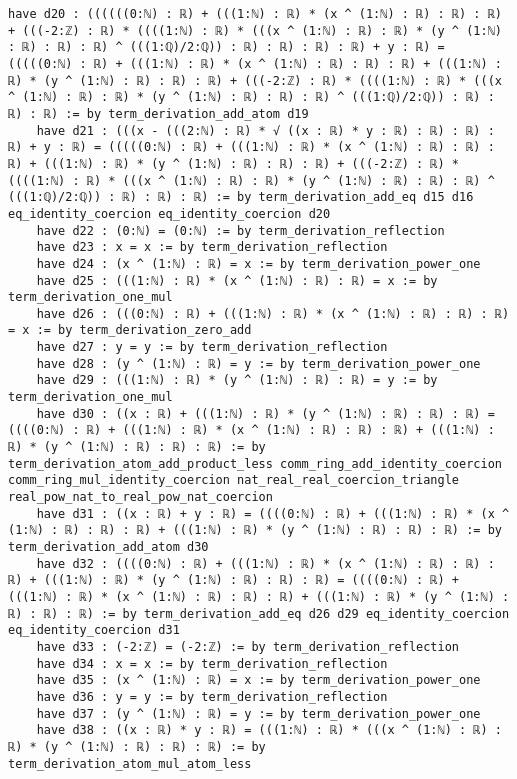 \documentclass{article}
\begin{document}
\begin{tcolorbox}[colback=white!10, width=\linewidth]
\begin{lstlisting}[language=Lean4]
    have d20 : ((((((0:ℕ) : ℝ) + (((1:ℕ) : ℝ) * (x ^ (1:ℕ) : ℝ) : ℝ) : ℝ) + (((-2:ℤ) : ℝ) * ((((1:ℕ) : ℝ) * (((x ^ (1:ℕ) : ℝ) : ℝ) * (y ^ (1:ℕ) : ℝ) : ℝ) : ℝ) ^ (((1:ℚ)/2:ℚ)) : ℝ) : ℝ) : ℝ) : ℝ) + y : ℝ) = (((((0:ℕ) : ℝ) + (((1:ℕ) : ℝ) * (x ^ (1:ℕ) : ℝ) : ℝ) : ℝ) + (((1:ℕ) : ℝ) * (y ^ (1:ℕ) : ℝ) : ℝ) : ℝ) + (((-2:ℤ) : ℝ) * ((((1:ℕ) : ℝ) * (((x ^ (1:ℕ) : ℝ) : ℝ) * (y ^ (1:ℕ) : ℝ) : ℝ) : ℝ) ^ (((1:ℚ)/2:ℚ)) : ℝ) : ℝ) : ℝ) := by term_derivation_add_atom d19
    have d21 : (((x - (((2:ℕ) : ℝ) * √ ((x : ℝ) * y : ℝ) : ℝ) : ℝ) : ℝ) + y : ℝ) = (((((0:ℕ) : ℝ) + (((1:ℕ) : ℝ) * (x ^ (1:ℕ) : ℝ) : ℝ) : ℝ) + (((1:ℕ) : ℝ) * (y ^ (1:ℕ) : ℝ) : ℝ) : ℝ) + (((-2:ℤ) : ℝ) * ((((1:ℕ) : ℝ) * (((x ^ (1:ℕ) : ℝ) : ℝ) * (y ^ (1:ℕ) : ℝ) : ℝ) : ℝ) ^ (((1:ℚ)/2:ℚ)) : ℝ) : ℝ) : ℝ) := by term_derivation_add_eq d15 d16 eq_identity_coercion eq_identity_coercion d20
    have d22 : (0:ℕ) = (0:ℕ) := by term_derivation_reflection
    have d23 : x = x := by term_derivation_reflection
    have d24 : (x ^ (1:ℕ) : ℝ) = x := by term_derivation_power_one
    have d25 : (((1:ℕ) : ℝ) * (x ^ (1:ℕ) : ℝ) : ℝ) = x := by term_derivation_one_mul
    have d26 : (((0:ℕ) : ℝ) + (((1:ℕ) : ℝ) * (x ^ (1:ℕ) : ℝ) : ℝ) : ℝ) = x := by term_derivation_zero_add
    have d27 : y = y := by term_derivation_reflection
    have d28 : (y ^ (1:ℕ) : ℝ) = y := by term_derivation_power_one
    have d29 : (((1:ℕ) : ℝ) * (y ^ (1:ℕ) : ℝ) : ℝ) = y := by term_derivation_one_mul
    have d30 : ((x : ℝ) + (((1:ℕ) : ℝ) * (y ^ (1:ℕ) : ℝ) : ℝ) : ℝ) = ((((0:ℕ) : ℝ) + (((1:ℕ) : ℝ) * (x ^ (1:ℕ) : ℝ) : ℝ) : ℝ) + (((1:ℕ) : ℝ) * (y ^ (1:ℕ) : ℝ) : ℝ) : ℝ) := by term_derivation_atom_add_product_less comm_ring_add_identity_coercion comm_ring_mul_identity_coercion nat_real_real_coercion_triangle real_pow_nat_to_real_pow_nat_coercion
    have d31 : ((x : ℝ) + y : ℝ) = ((((0:ℕ) : ℝ) + (((1:ℕ) : ℝ) * (x ^ (1:ℕ) : ℝ) : ℝ) : ℝ) + (((1:ℕ) : ℝ) * (y ^ (1:ℕ) : ℝ) : ℝ) : ℝ) := by term_derivation_add_atom d30
    have d32 : ((((0:ℕ) : ℝ) + (((1:ℕ) : ℝ) * (x ^ (1:ℕ) : ℝ) : ℝ) : ℝ) + (((1:ℕ) : ℝ) * (y ^ (1:ℕ) : ℝ) : ℝ) : ℝ) = ((((0:ℕ) : ℝ) + (((1:ℕ) : ℝ) * (x ^ (1:ℕ) : ℝ) : ℝ) : ℝ) + (((1:ℕ) : ℝ) * (y ^ (1:ℕ) : ℝ) : ℝ) : ℝ) := by term_derivation_add_eq d26 d29 eq_identity_coercion eq_identity_coercion d31
    have d33 : (-2:ℤ) = (-2:ℤ) := by term_derivation_reflection
    have d34 : x = x := by term_derivation_reflection
    have d35 : (x ^ (1:ℕ) : ℝ) = x := by term_derivation_power_one
    have d36 : y = y := by term_derivation_reflection
    have d37 : (y ^ (1:ℕ) : ℝ) = y := by term_derivation_power_one
    have d38 : ((x : ℝ) * y : ℝ) = (((1:ℕ) : ℝ) * (((x ^ (1:ℕ) : ℝ) : ℝ) * (y ^ (1:ℕ) : ℝ) : ℝ) : ℝ) := by term_derivation_atom_mul_atom_less

\end{lstlisting}
\end{tcolorbox}
\end{document}
